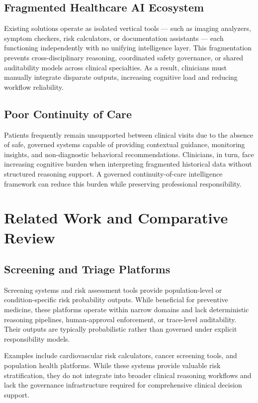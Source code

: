 \documentclass[conference]{IEEEtran}
\begin{document}
\subsection{Fragmented Healthcare AI Ecosystem}
Existing solutions operate as isolated vertical tools — such as imaging analyzers, symptom checkers, risk calculators, or documentation assistants — each functioning independently with no unifying intelligence layer. This fragmentation prevents cross-disciplinary reasoning, coordinated safety governance, or shared auditability models across clinical specialties. As a result, clinicians must manually integrate disparate outputs, increasing cognitive load and reducing workflow reliability.

\subsection{Poor Continuity of Care}
Patients frequently remain unsupported between clinical visits due to the absence of safe, governed systems capable of providing contextual guidance, monitoring insights, and non-diagnostic behavioral recommendations. Clinicians, in turn, face increasing cognitive burden when interpreting fragmented historical data without structured reasoning support. A governed continuity-of-care intelligence framework can reduce this burden while preserving professional responsibility.

\section{Related Work and Comparative Review}

\subsection{Screening and Triage Platforms}
Screening systems and risk assessment tools provide population-level or condition-specific risk probability outputs. While beneficial for preventive medicine, these platforms operate within narrow domains and lack deterministic reasoning pipelines, human-approval enforcement, or trace-level auditability. Their outputs are typically probabilistic rather than governed under explicit responsibility models.

Examples include cardiovascular risk calculators, cancer screening tools, and population health platforms. While these systems provide valuable risk stratification, they do not integrate into broader clinical reasoning workflows and lack the governance infrastructure required for comprehensive clinical decision support.
\end{document}
